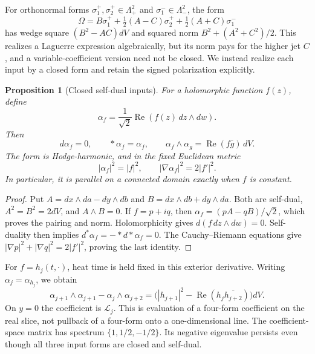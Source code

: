 \documentclass[11pt]{article}
\numberwithin{equation}{section}
\newtheorem{proposition}[theorem]{Proposition}
\theoremstyle{definition}
\theoremstyle{remark}
\begin{document}
For orthonormal forms $\sigma^+_1,\sigma^+_2\in\Lambda^2_+$ and
$\sigma^-_1\in\Lambda^2_-$, the form
\[
 \Omega=B\sigma^+_1+\tfrac12(A-C)\sigma^+_2
                     +\tfrac12(A+C)\sigma^-_1
\]
has wedge square $(B^2-AC)dV$ and squared norm
$B^2+(A^2+C^2)/2$.  This realizes a Laguerre expression algebraically,
but its norm pays for the higher jet $C$, and a variable-coefficient
version need not be closed.  We instead realize each input by a closed
form and retain the signed polarization explicitly.

\begin{proposition}[Closed self-dual inputs]\label{forms:closed}
For a holomorphic function $f(z)$, define
\[
 \alpha_f=\frac1{\sqrt2}\operatorname{Re}(f(z)\,dz\wedge dw).
\]
Then
\begin{equation}\label{forms:pairing}
 d\alpha_f=0,\qquad *\alpha_f=\alpha_f,\qquad
 \alpha_f\wedge\alpha_g=\operatorname{Re}(f\overline g)\,dV.
\end{equation}
The form is Hodge-harmonic, and in the fixed Euclidean metric
\begin{equation}\label{forms:parallel}
 |\alpha_f|^2=|f|^2,\qquad |\nabla\alpha_f|^2=2|f'|^2.
\end{equation}
In particular, it is parallel on a connected domain exactly when $f$
is constant.
\end{proposition}
\begin{proof}
Put $A=dx\wedge da-dy\wedge db$ and
$B=dx\wedge db+dy\wedge da$.  Both are self-dual,
$A^2=B^2=2dV$, and $A\wedge B=0$.  If $f=p+iq$, then
$\alpha_f=(pA-qB)/\sqrt2$, which proves the pairing and norm.
Holomorphicity gives $d(f\,dz\wedge dw)=0$.  Self-duality then implies
$d^*\alpha_f=-*d*\alpha_f=0$.  The Cauchy--Riemann equations give
$|\nabla p|^2+|\nabla q|^2=2|f'|^2$, proving the last identity.
\end{proof}

For $f=h_j(t,\cdot)$, heat time is held fixed in this exterior
derivative.  Writing $\alpha_j=\alpha_{h_j}$, we obtain
\begin{equation}\label{forms:laguerre}
 \alpha_{j+1}\wedge\alpha_{j+1}-\alpha_j\wedge\alpha_{j+2}
 =\bigl(|h_{j+1}|^2-\operatorname{Re}(h_j\overline{h_{j+2}})\bigr)dV.
\end{equation}
On $y=0$ the coefficient is $\mathcal L_j$.  This is evaluation of a
four-form coefficient on the real slice, not pullback of a four-form
onto a one-dimensional line.  The coefficient-space matrix has spectrum
$\{1,1/2,-1/2\}$.  Its negative eigenvalue persists even though all
three input forms are closed and self-dual.
\end{document}
